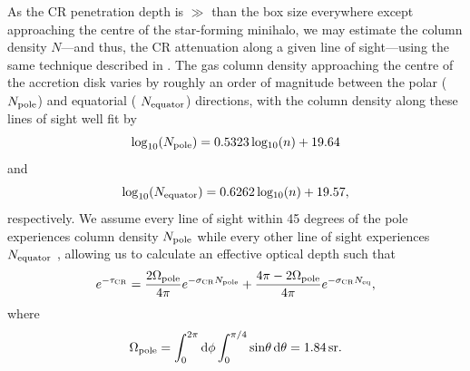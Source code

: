 \documentclass[usenatbib]{mn2e}
\begin{document}
As the CR penetration depth is $\gg$ than the box size everywhere except approaching the centre of the star-forming minihalo, we may estimate the column density $N$---and thus, the CR attenuation along a given line of sight---using the same technique described in \citet{Hummeletal2015}. 
The gas column density approaching the centre of the accretion disk varies by roughly an order of magnitude between the polar ($N_{\rm \small pole}$) and equatorial ( $N_{\rm \small equator}$) directions, with the column density  along these lines of sight well fit by
\begin{equation}
{\rm log}_{10}(N_{\rm \small pole}) = 0.5323\, {\rm log_{10}}(n) + 19.64
\end{equation}
and
\begin{equation}
{\rm log}_{10}(N_{\rm \small equator}) = 0.6262\, {\rm log_{10}}(n) + 19.57, 
\end{equation}
respectively. We assume every line of sight within 45 degrees of the pole experiences column density $N_{\rm \small pole}$ while every other line of sight experiences $N_{\rm \small equator}$ \citep{Hosokawaetal2011}, allowing us to calculate an effective optical depth such that
\begin{equation}
e^{-\tau_{\rm \small CR}} = \frac{2 \Omega_{\rm \small pole}}{4\pi} e^{-\sigma_{\rm \small CR} N_{\rm \small pole}} + \frac{4\pi - 2 \Omega_{\rm \small pole}}{4\pi} e^{-\sigma_{\rm \small CR} N_{\rm \small eq}},
\end{equation}
where
\begin{equation}
\Omega_{\rm \small pole} = \int_0^{2\pi}{\rm d}\phi \int_0^{\pi/4}{\rm sin}\theta \,{\rm d}\theta = 1.84\,{\rm sr}.
\end{equation}
\end{document}
